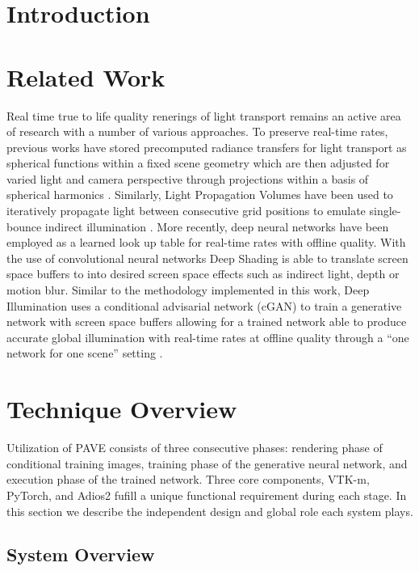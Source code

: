 \documentclass[sigconf,authordraft]{acmart}
\begin{document}
\section{Introduction}


\section{Related Work}

Real time true to life quality renerings of light transport remains an active area of research with a number of various approaches. To preserve real-time rates, previous works have stored precomputed radiance transfers for light transport as spherical functions within a fixed scene geometry which are then adjusted for varied light and camera perspective through projections within a basis of spherical harmonics \cite{sloanPrecompRad}. Similarly, Light Propagation Volumes have been used to iteratively propagate light between consecutive grid positions to emulate single-bounce indirect illumination \cite{kaplanyanCasac}. More recently, deep neural  networks have been employed as a learned look up table for real-time rates with offline quality. With the use of convolutional neural networks Deep Shading is able to translate screen space buffers to into desired screen space effects such as indirect light, depth or motion blur. Similar to the methodology implemented in this work, Deep Illumination uses a conditional advisarial network (cGAN) to train a generative network with screen space buffers allowing for a trained network able to produce accurate global illumination with real-time rates at offline quality through a ``one network for one scene'' setting  \cite{deepillum}.

\section{Technique Overview}

Utilization of PAVE consists of three consecutive phases: rendering phase of conditional training images, training phase of the generative neural network, and execution phase of the trained network. Three core components, VTK-m, PyTorch, and Adios2 fufill a unique functional requirement during each stage. In this section we describe the independent design and global role each system plays.

\subsection{System Overview}
 
\end{document}
